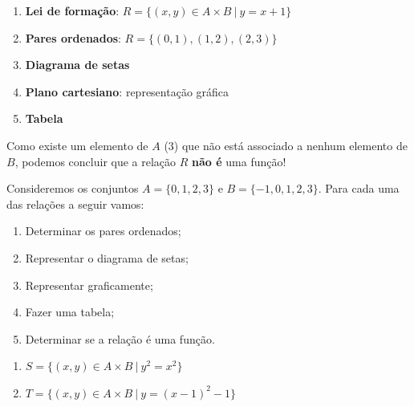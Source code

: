 \documentclass[12pt,a4paper]{article}
\begin{document}
	\begin{enumerate}[label=\Roman*)]
		\item \textbf{Lei de formação}: $R = \{ (x, y) \in A \times B ~ | ~ y = x + 1\}$
		\item \textbf{Pares ordenados}: $R = \{(0, 1), (1, 2), (2, 3)\}$
		\item \textbf{Diagrama de setas}
		\item \textbf{Plano cartesiano}: representação gráfica
		\item \textbf{Tabela}
	\end{enumerate}
	
	\begin{meudestaque}
		Como existe um elemento de $A$ (3) que não está associado a nenhum elemento de $B$, podemos concluir que a relação $R$ \textbf{não é} uma função!
	\end{meudestaque}
	

Consideremos os conjuntos $A = \{0, 1, 2, 3\}$ e $B = \{-1, 0, 1, 2, 3\}$. Para cada uma das relações a seguir vamos:

	\begin{enumerate}[label=\roman*.]
		\item Determinar os pares ordenados;
		\item Representar o diagrama de setas;
		\item Representar graficamente;
		\item Fazer uma tabela;
		\item Determinar se a relação é uma função.
	\end{enumerate}
	
	
\begin{enumerate}[label=\alph*)]
	\item $S = \{ (x, y) \in A \times B ~ | ~ y^2 = x^2 \}$
	
	\item $T = \{ (x, y) \in A \times B ~ | ~ y = (x-1)^2 -1 \}$

\end{enumerate}	
\end{document}
